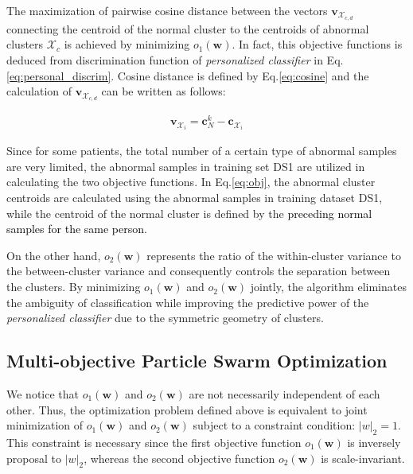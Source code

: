 The maximization of pairwise cosine distance between the vectors $\mathbf{v}_{\mathcal{X}_{c,d}}$ connecting the centroid of the normal cluster to the centroids of abnormal clusters $\mathcal{X}_c$ is achieved by minimizing $o_1(\mathbf{w})$. In fact, this objective functions is deduced from discrimination function of \textit{personalized classifier} in Eq.\ref{eq:personal_discrim}. Cosine distance is defined by Eq.\ref{eq:cosine} and the calculation of $\mathbf{v}_{\mathcal{X}_{c,d}}$ can be written as follows: %

\begin{align}
\mathbf{v}_{\mathcal{X}_i} = \mathbf{c}^k_N -  \mathbf{c}_{\mathcal{X}_i}
\end{align}

Since for some patients, the total number of a certain type of abnormal samples are very limited, the abnormal samples in training set DS1 are utilized in calculating the two objective functions. In Eq.\ref{eq:obj}, the abnormal cluster centroids are calculated using the abnormal samples in training dataset DS1, while the centroid of the normal cluster is defined by the \textcolor{black}{preceding normal samples for the same person}. %

On the other hand, $o_2(\mathbf{w})$ represents the ratio of the within-cluster variance to the between-cluster variance and consequently controls the separation between the clusters. By minimizing $o_1(\mathbf{w})$ and $o_2(\mathbf{w})$ jointly, the algorithm eliminates the ambiguity of classification while %
improving the predictive power of the \textit{personalized classifier} due to the symmetric geometry of clusters. 

\subsection{Multi-objective Particle Swarm Optimization}

We notice that $o_1(\mathbf{w}) $ and $o_2(\mathbf{w})$ are not necessarily independent of each other. Thus, the optimization problem defined above is equivalent to joint minimization of $o_1(\mathbf{w}) $ and $o_2(\mathbf{w})$ subject to a constraint condition: $|w|_2=1$. This constraint is necessary since the first objective function $o_1(\mathbf{w})$ is inversely proposal to $|w|_2$, whereas the second objective function $o_2(\mathbf{w})$ is scale-invariant. 

